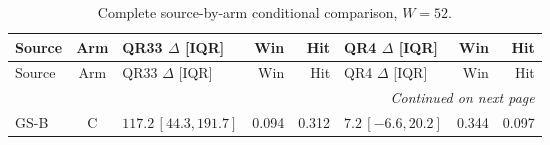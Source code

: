 \begingroup
\fontsize{9}{10.2}\selectfont
\setlength{\tabcolsep}{2.2pt}
\renewcommand{\arraystretch}{1.05}
\setlength{\LTpre}{2pt}
\setlength{\LTpost}{3pt}
\begin{longtable}{lcp{37mm}rrp{37mm}rr}
\caption{Complete source-by-arm conditional comparison, $W=52$.}\label{tab:v9-stability-w52}\\
\toprule
Source & Arm & QR33 $\Delta$ [IQR] & Win & Hit & QR4 $\Delta$ [IQR] & Win & Hit\\
\midrule
\endfirsthead
\toprule
Source & Arm & QR33 $\Delta$ [IQR] & Win & Hit & QR4 $\Delta$ [IQR] & Win & Hit\\
\midrule
\endhead
\midrule
\multicolumn{8}{r}{\emph{Continued on next page}}\\
\endfoot
\bottomrule
\endlastfoot
GS-B & C & \(117.2\,[44.3,191.7]\) & 0.094 & 0.312 & \(7.2\,[-6.6,20.2]\) & 0.344 & 0.097\\

\end{longtable}
